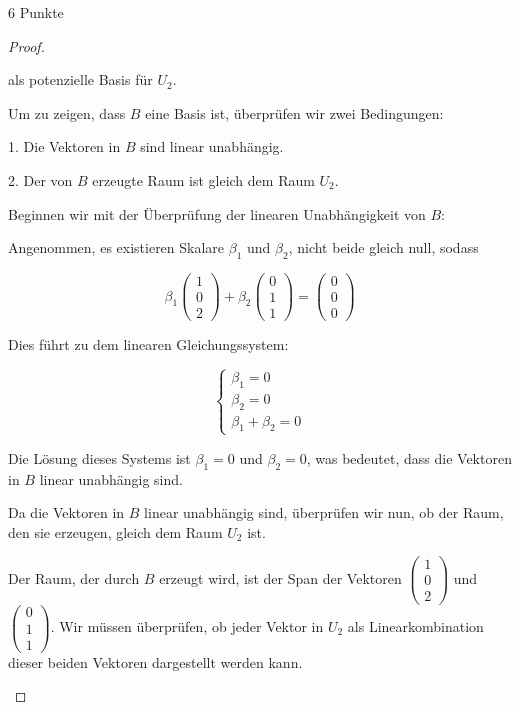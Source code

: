 \documentclass{problemset}
\begin{document}
\begin{problem}{6 Punkte}
\begin{proof}
\begin{enumerate}
              als potenzielle Basis für $U_2$.

              Um zu zeigen, dass $B$ eine Basis ist, überprüfen wir zwei
              Bedingungen:

              1. Die Vektoren in $B$ sind linear unabhängig.

              2. Der von $B$ erzeugte Raum ist gleich dem Raum $U_2$.

              Beginnen wir mit der Überprüfung der linearen Unabhängigkeit von
              $B$:

              Angenommen, es existieren Skalare $\beta_1$ und $\beta_2$, nicht
              beide gleich null, sodass

              \[
                  \beta_1 \begin{pmatrix} 1 \\ 0 \\ 2 \end{pmatrix} + \beta_2 \begin{pmatrix} 0 \\ 1 \\ 1 \end{pmatrix} = \begin{pmatrix} 0 \\ 0 \\ 0 \end{pmatrix}
              \]

              Dies führt zu dem linearen Gleichungssystem:

              \[
                  \begin{cases}
                      \beta_1 = 0 \\
                      \beta_2 = 0 \\
                      \beta_1 + \beta_2 = 0
                  \end{cases}
              \]

              Die Lösung dieses Systems ist $\beta_1 = 0$ und $\beta_2 = 0$,
              was bedeutet, dass die Vektoren in $B$ linear unabhängig sind.

              Da die Vektoren in $B$ linear unabhängig sind, überprüfen wir
              nun, ob der Raum, den sie erzeugen, gleich dem Raum $U_2$ ist.

              Der Raum, der durch $B$ erzeugt wird, ist der Span der Vektoren $\begin{pmatrix} 1 \\ 0 \\ 2 \end{pmatrix}$ und $\begin{pmatrix} 0 \\ 1 \\ 1 \end{pmatrix}$. Wir müssen überprüfen, ob jeder Vektor in $U_2$ als Linearkombination dieser beiden Vektoren dargestellt werden kann.


\end{enumerate}
\end{proof}
\end{problem}
\end{document}
